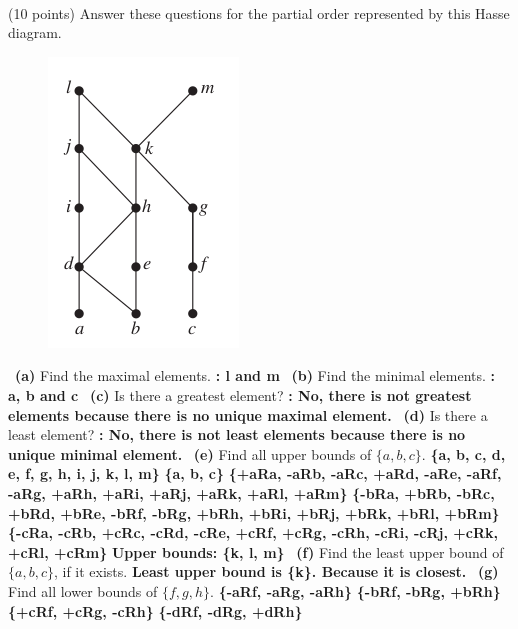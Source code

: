 \documentclass[a4 paper]{article}
\numberwithin{equation}{section}
\newcommand{\problem}[2]{~\\\fbox{\textbf{Problem #1}}\hfill (#2 points)\newline\newline}
\newcommand{\subproblem}[1]{~\newline\textbf{(#1)}}
\newcommand{\0}{\mathbf{0}}
\begin{document}
\problem{6: Relations}{10}
Answer these questions for the partial order represented by this Hasse diagram.
\begin{figure}[htb]
	\includegraphics[scale=0.5]{hasse.png}
\end{figure}
\subproblem{a} Find the maximal elements.
\textbf{: l and m}
\subproblem{b} Find the minimal elements.
\textbf{: a, b and c}
\subproblem{c} Is there a greatest element?
\textbf{: No, there is not greatest elements because there is no unique maximal element.}
\subproblem{d} Is there a least element?
\textbf{: No, there is not least elements because there is no unique minimal element.}
\subproblem{e} Find all upper bounds of $\{a, b, c\}$.
\newline
\textbf{\{a, b, c, d, e, f, g, h, i, j, k, l, m\}}
\newline
\textbf{\{a, b, c\}}
\newline
\textbf{\{+aRa, -aRb, -aRc, +aRd, -aRe, -aRf, -aRg, +aRh, +aRi, +aRj, +aRk, +aRl, +aRm\}}
\newline
\textbf{\{-bRa, +bRb, -bRc, +bRd, +bRe, -bRf, -bRg, +bRh, +bRi, +bRj, +bRk, +bRl, +bRm\}}
\newline
\textbf{\{-cRa, -cRb, +cRc, -cRd, -cRe, +cRf, +cRg, -cRh, -cRi, -cRj, +cRk, +cRl, +cRm\}}
\newline
\textbf{Upper bounds: \{k, l, m\}}
\subproblem{f} Find the least upper bound of  $\{a, b, c\}$, if it exists.
\textbf{Least upper bound is \{k\}. Because it is closest.}
\subproblem{g} Find all lower bounds of  $\{f, g, h\}$.
\newline
\textbf{\{-aRf, -aRg, -aRh\}}
\newline
\textbf{\{-bRf, -bRg, +bRh\}}
\newline
\textbf{\{+cRf, +cRg, -cRh\}}
\newline
\textbf{\{-dRf, -dRg, +dRh\}}
\end{document}
